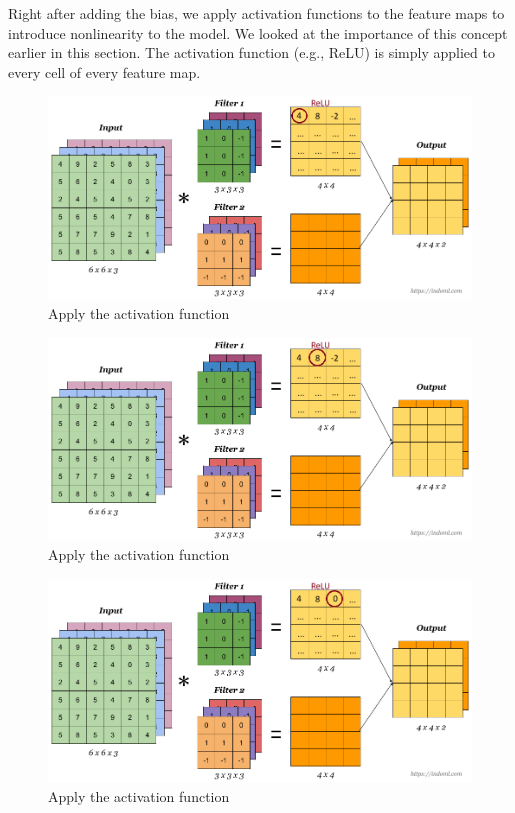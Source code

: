 \documentclass[a4paper,12pt]{report}
\begin{document}
\FloatBarrier
Right after adding the bias, we apply activation functions to the feature maps to introduce nonlinearity to the model. We looked at the importance of this concept earlier in this section. The activation function (e.g., ReLU) is simply applied to every cell of every feature map. 
\begin{figure}[htbp]
  \centering
  \includegraphics[width=\textwidth]{images/CNN_filters_4.png}
  \caption{Apply the activation function}
  \label{fig:fullwidth}
\end{figure}

\begin{figure}[htbp]
  \centering
  \includegraphics[width=\textwidth]{images/CNN_filters_5.png}
  \caption{Apply the activation function}
  \label{fig:fullwidth}
\end{figure}

\FloatBarrier
\begin{figure}[htbp]
  \centering
  \includegraphics[width=\textwidth]{images/CNN_filters_6.png}
  \caption{Apply the activation function}
  \label{fig:fullwidth}
\end{figure}
	
\end{document}
